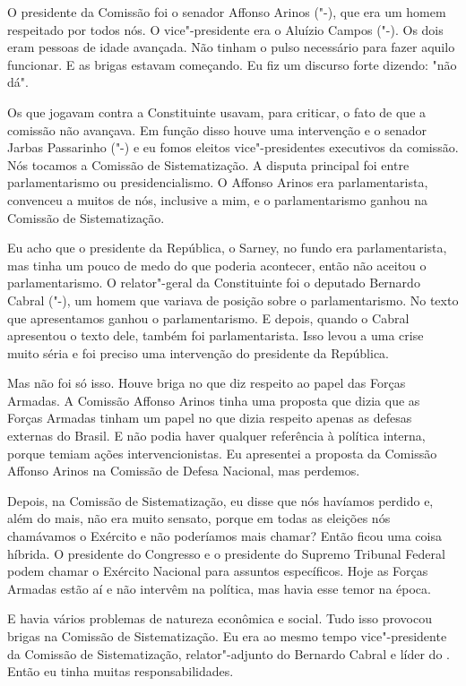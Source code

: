 O presidente da Comissão foi o senador Affonso Arinos
("-), que era um homem respeitado por todos nós. O vice"-presidente
era o Aluízio Campos ("-). Os dois eram pessoas de idade avançada.
Não tinham o pulso necessário para fazer aquilo funcionar. E as brigas
estavam começando. Eu fiz um discurso forte dizendo: "não dá".

Os que jogavam contra a Constituinte usavam, para criticar, o fato de
que a comissão não avançava. Em função disso houve uma intervenção e o
senador Jarbas Passarinho ("-) e eu fomos eleitos vice"-presidentes
executivos da comissão. Nós tocamos a Comissão de Sistematização. A
disputa principal foi entre parlamentarismo ou presidencialismo. O
Affonso Arinos era parlamentarista, convenceu a muitos de nós, inclusive
a mim, e o parlamentarismo ganhou na Comissão de Sistematização.

Eu acho que o presidente da República, o Sarney, no fundo era
parlamentarista, mas tinha um pouco de medo do que poderia acontecer,
então não aceitou o parlamentarismo. O relator"-geral da Constituinte foi
o deputado Bernardo Cabral ("-), um homem que variava de posição
sobre o parlamentarismo. No texto que apresentamos ganhou o
parlamentarismo. E depois, quando o Cabral apresentou o texto dele,
também foi parlamentarista. Isso levou a uma crise muito séria e foi
preciso uma intervenção do presidente da República.

Mas não foi só isso. Houve briga no que diz respeito ao papel das Forças
Armadas. A Comissão Affonso Arinos tinha uma proposta que dizia que as
Forças Armadas tinham um papel no que dizia respeito apenas as defesas
externas do Brasil. E não podia haver qualquer referência à política
interna, porque temiam ações intervencionistas. Eu apresentei a proposta
da Comissão Affonso Arinos na Comissão de Defesa Nacional, mas perdemos.

Depois, na Comissão de Sistematização, eu disse que nós havíamos perdido
e, além do mais, não era muito sensato, porque em todas as eleições nós
chamávamos o Exército e não poderíamos mais chamar? Então ficou uma
coisa híbrida. O presidente do Congresso e o presidente do Supremo
Tribunal Federal podem chamar o Exército Nacional para assuntos
específicos. Hoje as Forças Armadas estão aí e não intervêm na política,
mas havia esse temor na época.

E havia vários problemas de natureza econômica e social. Tudo isso
provocou brigas na Comissão de Sistematização. Eu era ao mesmo tempo
vice"-presidente da Comissão de Sistematização, relator"-adjunto do
Bernardo Cabral e líder do . Então eu tinha muitas
responsabilidades.

